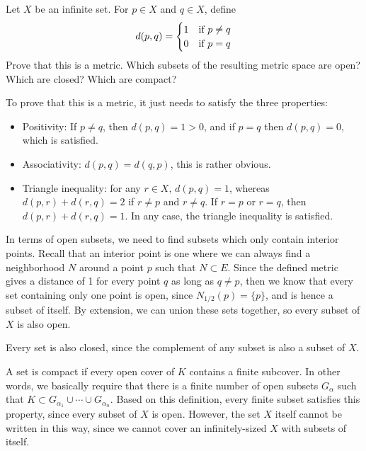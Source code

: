 \documentclass[10pt]{article}
\begin{document}
	\begin{problem}
		Let \( X \) be an infinite set. For \( p \in X \) and \( q \in X \), define
		 \[
		 d(p, q) = \begin{cases}
			 1 & \text{if \( p \neq q \)}\\
			 0 & \text{if \( p = q \)}
		 \end{cases}
		 \] 
		 Prove that this is a metric. Which subsets of the resulting metric space are open? Which are closed? 
		 Which are compact? 
	\end{problem}

	\begin{solution}
		To prove that this is a metric, it just needs to satisfy the three properties:
		\begin{itemize}
			\item Positivity: If \( p \neq q \), then \( d(p, q) = 1 > 0 \), and if \( p = q \) then
				\( d(p, q) = 0 \), which is satisfied. 
			\item Associativity: \( d(p, q) = d(q, p) \), this is rather obvious. 
			\item Triangle inequality: for any \( r \in X \), \( d(p, q) = 1 \), whereas \( d(p, r) + d(r, q) = 2 \) 
				if \( r \neq p \) and \( r \neq q \). If  \( r = p \) or \( r = q \), then 
				\( d(p, r) + d(r,q) = 1 \). In any case, the triangle inequality is satisfied. 
		\end{itemize}
		In terms of open subsets, we need to find subsets which only contain interior points. Recall that an 
		interior point is one where we can always find a neighborhood \( N \) around a point \( p \) such that 
		\( N \subset E \). Since the defined metric gives a distance of 1 for every point \( q  \) as long as 
		\( q \neq p \), then we know that every set containing only one point is open, since  \( N_{1/2}(p) = \{p\} \),
		and is hence a subset of itself. By extension, we can union these sets together, so every subset
		of \( X \) is also open. 

		Every set is also closed, since the complement of any subset is also a subset of \( X \).     

		A set is compact if every open cover of \( K \) contains a finite subcover. In other words, we basically 
		require that there is a finite number of open subsets \( G_\alpha \) such that 
		\( K \subset G_{\alpha_1} \cup \cdots \cup G_{\alpha_n} \). Based on this definition, every finite 
		subset satisfies this property, since every subset of \( X \) is open. However, the set \( X \) itself
		cannot be written in this way, since we cannot cover an infinitely-sized \( X \) with subsets of itself.  
	\end{solution}
\end{document}
